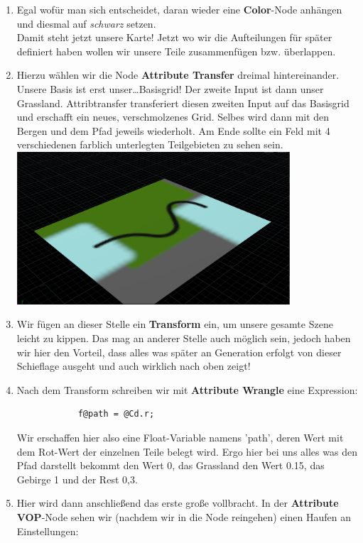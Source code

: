 \documentclass[paper=a4,fontsize=12pt,ngerman]{scrartcl}
\begin{document}
\begin{enumerate}
		\item Egal wofür man sich entscheidet, daran wieder eine \textbf{Color}-Node anhängen und diesmal auf \textit{schwarz} setzen.\\ 
		Damit steht jetzt unsere Karte! 
		Jetzt wo wir die Aufteilungen für später definiert haben wollen wir unsere Teile zusammenfügen bzw. überlappen.
		\item Hierzu wählen wir die Node \textbf{Attribute Transfer} dreimal hintereinander. Unsere Basis ist erst unser…Basisgrid! Der zweite Input ist dann unser Grassland. Attribtransfer transferiert diesen zweiten Input auf das Basisgrid und erschafft ein neues, verschmolzenes Grid. 
		Selbes wird dann mit den Bergen und dem Pfad jeweils wiederholt.
		Am Ende sollte ein Feld mit 4 verschiedenen farblich unterlegten Teilgebieten zu sehen sein.\\
		\includegraphics*[width=0.8\textwidth]{graphics/Nedim2.png}\\
		\item Wir fügen an dieser Stelle ein \textbf{Transform} ein, um unsere gesamte Szene leicht zu kippen. Das mag an anderer Stelle auch möglich sein, jedoch haben wir hier den Vorteil, dass alles was später an Generation erfolgt von dieser Schieflage ausgeht und auch wirklich nach oben zeigt!
		\item Nach dem Transform schreiben wir mit \textbf{Attribute Wrangle} eine Expression: 
		\begin{lstlisting}
			f@path = @Cd.r;
		\end{lstlisting}
		Wir erschaffen hier also eine Float-Variable namens 'path', deren Wert mit dem Rot-Wert der einzelnen Teile belegt wird. Ergo hier bei uns alles was den Pfad darstellt bekommt den Wert 0, das Grassland den Wert 0.15, das Gebirge 1 und der Rest 0,3.
		\item Hier wird dann anschließend das erste große vollbracht. In der \textbf{Attribute VOP}-Node sehen wir (nachdem wir in die Node reingehen) einen Haufen an Einstellungen:\\

\end{enumerate}
\end{document}
